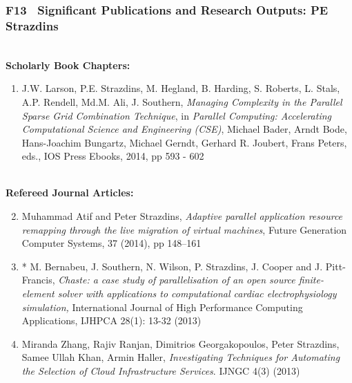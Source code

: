 \documentclass[a4paper,oneside,12pt]{article}
\begin{document}
\subsubsection*{F13~ Significant Publications and Research Outputs: 
PE Strazdins}


~\\
\textbf{Scholarly Book Chapters:}
\begin{enumerate}
\item J.W. Larson, P.E. Strazdins, M. Hegland, B. Harding, S. Roberts,
  L. Stals, A.P. Rendell, Md.M. Ali, J. Southern, {\em Managing                 
    Complexity in the Parallel Sparse Grid Combination Technique}, in
  {\em Parallel Computing: Accelerating Computational Science and               
    Engineering (CSE)}, Michael Bader, Arndt Bode, Hans-Joachim
  Bungartz, Michael Gerndt, Gerhard R. Joubert, Frans Peters, eds.,
  IOS Press Ebooks, 2014, pp 593 - 602
\end{enumerate}


~\\
\textbf{Refereed Journal Articles:}

\begin{enumerate}
\setcounter{enumi}{1}
\item Muhammad Atif and Peter Strazdins,
{\em Adaptive parallel application resource remapping                           
through the live migration of virtual machines},
Future Generation Computer Systems,
37 (2014), pp 148–161

\item * M. Bernabeu, J. Southern, N. Wilson, P. Strazdins, J. Cooper and
J. Pitt-Francis, {\em                                                           
  Chaste: a case study of parallelisation of an open source                     
  finite-element solver with applications to computational cardiac              
  electrophysiology simulation,}
International Journal of High Performance Computing Applications,
IJHPCA 28(1): 13-32 (2013)

\item

  Miranda Zhang, Rajiv Ranjan, Dimitrios Georgakopoulos, Peter
  Strazdins, Samee Ullah Khan, Armin Haller, {\em Investigating Techniques      
  for Automating the Selection of Cloud Infrastructure Services}. IJNGC
  4(3) (2013)
\end{enumerate}
\end{document}
